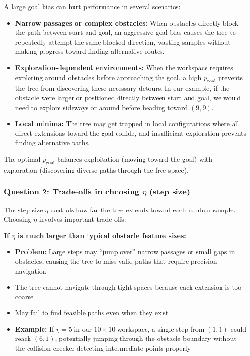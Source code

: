 \documentclass[11pt]{article}
\begin{document}
A large goal bias can hurt performance in several scenarios:
\begin{itemize}
    \item \textbf{Narrow passages or complex obstacles:} When obstacles directly block the path between start and goal, an aggressive goal bias causes the tree to repeatedly attempt the same blocked direction, wasting samples without making progress toward finding alternative routes.
    
    \item \textbf{Exploration-dependent environments:} When the workspace requires exploring around obstacles before approaching the goal, a high $p_{\text{goal}}$ prevents the tree from discovering these necessary detours. In our example, if the obstacle were larger or positioned directly between start and goal, we would need to explore sideways or around before heading toward $(9,9)$.
    
    \item \textbf{Local minima:} The tree may get trapped in local configurations where all direct extensions toward the goal collide, and insufficient exploration prevents finding alternative paths.
\end{itemize}

The optimal $p_{\text{goal}}$ balances exploitation (moving toward the goal) with exploration (discovering diverse paths through the free space).

\subsubsection*{Question 2: Trade-offs in choosing $\eta$ (step size)}

The step size $\eta$ controls how far the tree extends toward each random sample. Choosing $\eta$ involves important trade-offs:

\textbf{If $\eta$ is much larger than typical obstacle feature sizes:}
\begin{itemize}
    \item \textbf{Problem:} Large steps may ``jump over'' narrow passages or small gaps in obstacles, causing the tree to miss valid paths that require precision navigation
    \item The tree cannot navigate through tight spaces because each extension is too coarse
    \item May fail to find feasible paths even when they exist
    \item \textbf{Example:} If $\eta = 5$ in our $10 \times 10$ workspace, a single step from $(1,1)$ could reach $(6,1)$, potentially jumping through the obstacle boundary without the collision checker detecting intermediate points properly
\end{itemize}
\end{document}
